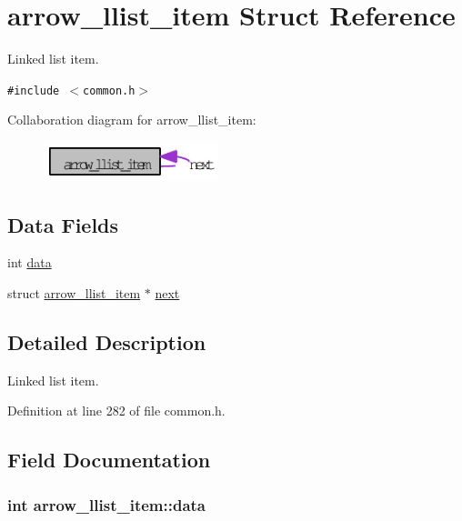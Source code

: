 \hypertarget{structarrow__llist__item}{
\section{arrow\_\-llist\_\-item Struct Reference}
\label{structarrow__llist__item}
}
Linked list item.  


{\tt \#include $<$common.h$>$}

Collaboration diagram for arrow\_\-llist\_\-item:\nopagebreak
\begin{figure}[H]
\begin{center}
\leavevmode
\includegraphics[width=144pt]{structarrow__llist__item__coll__graph}
\end{center}
\end{figure}
\subsection*{Data Fields}
\begin{CompactItemize}
\item 
int \hyperlink{structarrow__llist__item_a90478f82ffebd976893d9b84b6ce189}{data}
\item 
struct \hyperlink{structarrow__llist__item}{arrow\_\-llist\_\-item} $\ast$ \hyperlink{structarrow__llist__item_81a998b260ab022b05f1ff572327b871}{next}
\end{CompactItemize}


\subsection{Detailed Description}
Linked list item. 

Definition at line 282 of file common.h.

\subsection{Field Documentation}
\hypertarget{structarrow__llist__item_a90478f82ffebd976893d9b84b6ce189}{
\subsubsection[{data}]{\setlength{\rightskip}{0pt plus 5cm}int {\bf arrow\_\-llist\_\-item::data}}}
\label{structarrow__llist__item_a90478f82ffebd976893d9b84b6ce189}


